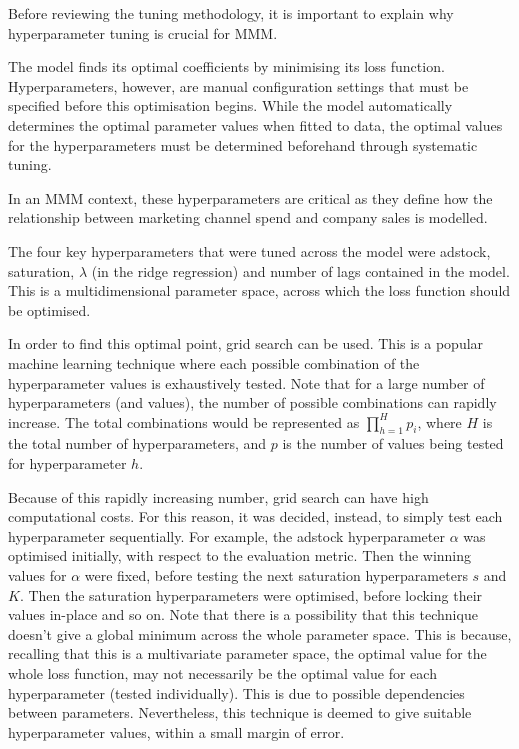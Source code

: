 \documentclass[11pt, a4paper]{article}
\begin{document}
Before reviewing the tuning methodology, it is important to explain why hyperparameter tuning is crucial for MMM. 

The model finds its optimal coefficients by minimising its loss function. Hyperparameters, however, are manual configuration settings that must be specified before this optimisation begins. While the model automatically determines the optimal parameter values when fitted to data, the optimal values for the hyperparameters must be determined beforehand through systematic tuning. 

In an MMM context, these hyperparameters are critical as they define how the relationship between marketing channel spend and company sales is modelled. 

The four key hyperparameters that were tuned across the model were adstock, saturation, $\lambda$ (in the ridge regression) and number of lags contained in the model. This is a multidimensional parameter space, across which the loss function should be optimised. 

In order to find this optimal point, grid search can be used. This is a popular machine learning technique where each possible combination of the hyperparameter values is exhaustively tested. Note that for a large number of hyperparameters (and values), the number of possible combinations can rapidly increase. The total combinations would be represented as $\prod_{h=1}^{H}p_{i}$, where $H$ is the total number of hyperparameters, and $p$ is the number of values being tested for hyperparameter $h$.

Because of this rapidly increasing number, grid search can have high computational costs. For this reason, it was decided, instead, to simply test each hyperparameter sequentially. For example, the adstock hyperparameter $\alpha$ was optimised initially, with respect to the evaluation metric. Then the winning values for $\alpha$ were fixed, before testing the next saturation hyperparameters $s$ and $K$. Then the saturation hyperparameters were optimised, before locking their values in-place and so on. Note that there is a possibility that this technique doesn’t give a global minimum across the whole parameter space. This is because, recalling that this is a multivariate parameter space, the optimal value for the whole loss function, may not necessarily be the optimal value for each hyperparameter (tested individually). This is due to possible dependencies between parameters. Nevertheless, this technique is deemed to give suitable hyperparameter values, within a small margin of error. 
\end{document}
